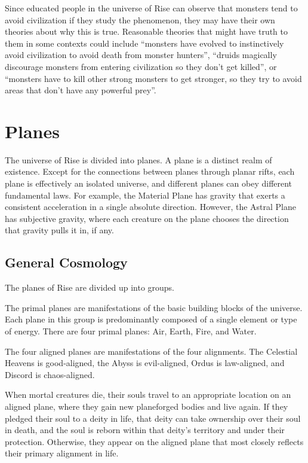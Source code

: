             Since educated people in the universe of Rise can observe that monsters tend to avoid civilization if they study the phenomenon, they may have their own theories about why this is true.
            Reasonable theories that might have truth to them in some contexts could include ``monsters have evolved to instinctively avoid civilization to avoid death from monster hunters'', ``druids magically discourage monsters from entering civilization so they don't get killed'', or ``monsters have to kill other strong monsters to get stronger, so they try to avoid areas that don't have any powerful prey''.

\section{Planes}\label{Planes}
    The universe of Rise is divided into planes.
    A plane is a distinct realm of existence.
    Except for the connections between planes through planar rifts, each plane is effectively an isolated universe, and different planes can obey different fundamental laws.
    For example, the Material Plane has gravity that exerts a consistent acceleration in a single absolute direction.
    However, the Astral Plane has subjective gravity, where each creature on the plane chooses the direction that gravity pulls it in, if any.

    \subsection{General Cosmology}
        The planes of Rise are divided up into groups.

         The primal planes are manifestations of the basic building blocks of the universe.
        Each plane in this group is predominantly composed of a single element or type of energy.
        There are four primal planes: Air, Earth, Fire, and Water.

         The four aligned planes are manifestations of the four alignments.
        The Celestial Heavens is good-aligned, the Abyss is evil-aligned, Ordus is law-aligned, and Discord is chaos-aligned.

        When mortal creatures die, their souls travel to an appropriate location on an aligned plane, where they gain new planeforged bodies and live again.
        If they pledged their soul to a deity in life, that deity can take ownership over their soul in death, and the soul is reborn within that deity's territory and under their protection.
        Otherwise, they appear on the aligned plane that most closely reflects their primary alignment in life.

